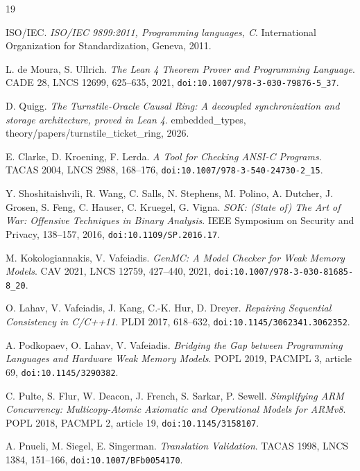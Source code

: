 \backmatter
{}
\begin{thebibliography}{19}

ISO/IEC. \emph{ISO/IEC 9899:2011, Programming languages, C}. International Organization for Standardization, Geneva, 2011.

L. de Moura, S. Ullrich. \emph{The Lean 4 Theorem Prover and Programming Language}. CADE 28, LNCS 12699, 625--635, 2021, \texttt{doi:10.1007/\allowbreak{}978-3-030-79876-5\_37}.

D. Quigg. \emph{The Turnstile-Oracle Causal Ring: A decoupled synchronization and storage architecture, proved in Lean 4}. embedded\_types, theory/\allowbreak{}papers/\allowbreak{}turnstile\_ticket\_ring, 2026.

E. Clarke, D. Kroening, F. Lerda. \emph{A Tool for Checking ANSI-C Programs}. TACAS 2004, LNCS 2988, 168--176, \texttt{doi:10.1007/\allowbreak{}978-3-540-24730-2\_15}.

Y. Shoshitaishvili, R. Wang, C. Salls, N. Stephens, M. Polino, A. Dutcher, J. Grosen, S. Feng, C. Hauser, C. Kruegel, G. Vigna. \emph{SOK: (State of) The Art of War: Offensive Techniques in Binary Analysis}. IEEE Symposium on Security and Privacy, 138--157, 2016, \texttt{doi:10.1109/\allowbreak{}SP.2016.17}.

M. Kokologiannakis, V. Vafeiadis. \emph{GenMC: A Model Checker for Weak Memory Models}. CAV 2021, LNCS 12759, 427--440, 2021, \texttt{doi:10.1007/\allowbreak{}978-3-030-81685-8\_20}.

O. Lahav, V. Vafeiadis, J. Kang, C.-K. Hur, D. Dreyer. \emph{Repairing Sequential Consistency in C/C++11}. PLDI 2017, 618--632, \texttt{doi:10.1145/\allowbreak{}3062341.3062352}.

A. Podkopaev, O. Lahav, V. Vafeiadis. \emph{Bridging the Gap between Programming Languages and Hardware Weak Memory Models}. POPL 2019, PACMPL 3, article 69, \texttt{doi:10.1145/\allowbreak{}3290382}.

C. Pulte, S. Flur, W. Deacon, J. French, S. Sarkar, P. Sewell. \emph{Simplifying ARM Concurrency: Multicopy-Atomic Axiomatic and Operational Models for ARMv8}. POPL 2018, PACMPL 2, article 19, \texttt{doi:10.1145/\allowbreak{}3158107}.

A. Pnueli, M. Siegel, E. Singerman. \emph{Translation Validation}. TACAS 1998, LNCS 1384, 151--166, \texttt{doi:10.1007/\allowbreak{}BFb0054170}.


\end{thebibliography}
